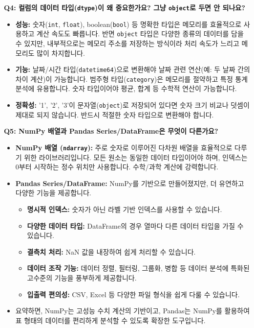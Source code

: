 \documentclass[11pt,a4paper]{book}
\theoremstyle{definition}
\begin{document}
\textbf{Q4: 컬럼의 데이터 타입(\texttt{dtype})이 왜 중요한가요? 그냥 \texttt{object}로 두면 안 되나요?}
\begin{itemize}
    \item \textbf{성능:} 숫자(\texttt{int}, \texttt{float}), boolean(\texttt{bool}) 등 명확한 타입은 메모리를 효율적으로 사용하고 계산 속도도 빠릅니다. 반면 \texttt{object} 타입은 다양한 종류의 데이터를 담을 수 있지만, 내부적으로는 메모리 주소를 저장하는 방식이라 처리 속도가 느리고 메모리도 많이 차지합니다.
    \item \textbf{기능:} 날짜/시간 타입(\texttt{datetime64})으로 변환해야 날짜 관련 연산(예: 두 날짜 간의 차이 계산)이 가능합니다. 범주형 타입(\texttt{category})은 메모리를 절약하고 특정 통계 분석에 유용합니다. 숫자 타입이어야 평균, 합계 등 수학적 연산이 가능합니다.
    \item \textbf{정확성:} '1', '2', '3'이 문자열(\texttt{object})로 저장되어 있다면 숫자 크기 비교나 덧셈이 제대로 되지 않습니다. 반드시 적절한 숫자 타입으로 변환해야 합니다.
\end{itemize}

\textbf{Q5: NumPy 배열과 Pandas Series/DataFrame은 무엇이 다른가요?}
\begin{itemize}
    \item \textbf{NumPy 배열 (\texttt{ndarray}):} 주로 숫자로 이루어진 다차원 배열을 효율적으로 다루기 위한 라이브러리입니다. 모든 원소는 동일한 데이터 타입이어야 하며, 인덱스는 0부터 시작하는 정수 위치만 사용합니다. 수학/과학 계산에 강력합니다.
    \item \textbf{Pandas Series/DataFrame:} NumPy를 기반으로 만들어졌지만, 더 유연하고 다양한 기능을 제공합니다.
        \begin{itemize}
            \item \textbf{명시적 인덱스:} 숫자가 아닌 라벨 기반 인덱스를 사용할 수 있습니다.
            \item \textbf{다양한 데이터 타입:} DataFrame의 경우 열마다 다른 데이터 타입을 가질 수 있습니다.
            \item \textbf{결측치 처리:} NaN 값을 내장하여 쉽게 처리할 수 있습니다.
            \item \textbf{데이터 조작 기능:} 데이터 정렬, 필터링, 그룹화, 병합 등 데이터 분석에 특화된 고수준의 기능을 풍부하게 제공합니다.
            \item \textbf{입출력 편의성:} CSV, Excel 등 다양한 파일 형식을 쉽게 다룰 수 있습니다.
        \end{itemize}
    \item 요약하면, NumPy는 고성능 수치 계산의 기반이고, Pandas는 NumPy를 활용하여 표 형태의 데이터를 편리하게 분석할 수 있도록 확장한 도구입니다.
\end{itemize}
\end{document}
